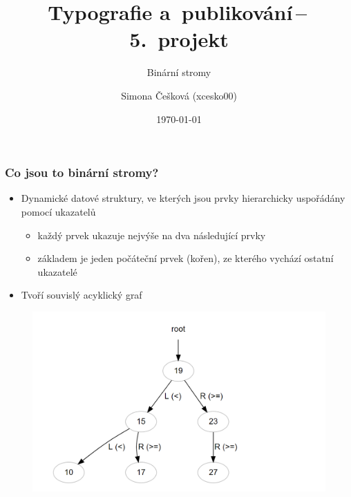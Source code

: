 \documentclass{beamer}
\title{Typografie a~publikování\,--\,5.~projekt}
\subtitle{Binární stromy}
\author{Simona Češková (xcesko00)}
\institute
{
	Vysoké učení technické v~Brně\\
	Fakulta informačních technologií
}
\date{\today}
\begin{document}
\frame{\titlepage}
\begin{frame}
\frametitle{Co jsou to binární stromy?}

\begin{itemize}
\item Dynamické datové struktury, ve kterých jsou prvky hierarchicky uspořádány pomocí ukazatelů

\begin{itemize}
    \item každý prvek ukazuje nejvýše na dva následující prvky
    \item základem je jeden počáteční prvek (kořen), ze kterého vychází ostatní ukazatelé 
\end{itemize}

\item Tvoří souvislý acyklický graf
\end{itemize}
\begin{figure}
\includegraphics[scale=0.15]{BS}
\end{figure}
\end{frame}
\end{document}
